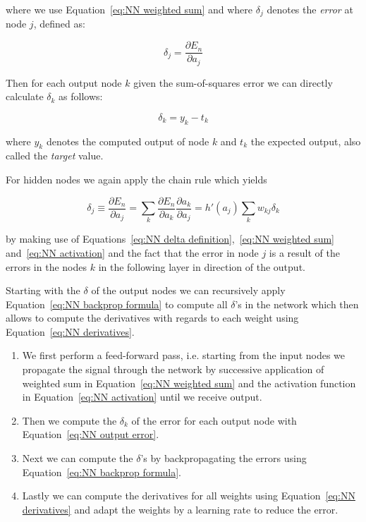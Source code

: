 where we use Equation~\ref{eq:NN weighted sum} and where $\delta_j$ denotes the \emph{error} at node $j$, defined as:

\begin{equation}
	\delta_j = \frac{\partial E_n}{\partial a_j}
	\label{eq:NN delta definition}
\end{equation}

Then for each output node $k$ given the sum-of-squares error we can directly calculate $\delta_k$ as follows:

\begin{equation}
	\delta_k = y_k - t_k
	\label{eq:NN output error}
\end{equation}

where $y_k$ denotes the computed output of node $k$ and $t_k$ the expected output, also called the \emph{target} value.

For hidden nodes we again apply the chain rule which yields

\begin{equation}
	\delta_j \equiv \frac{\partial E_n}{\partial a_j} = \sum_k \frac{\partial E_n}{\partial a_k} \frac{\partial a_k}{\partial a_j}
	= h'(a_j) \sum_k w_{kj}\delta_k
	\label{eq:NN backprop formula}
\end{equation}

by making use of Equations~\ref{eq:NN delta definition},~\ref{eq:NN weighted sum} and~\ref{eq:NN activation} and the fact that the error in node $j$ is a result of the errors in the nodes $k$ in the following layer in direction of the output.

Starting with the $\delta$ of the output nodes we can recursively apply Equation~\ref{eq:NN backprop formula} to compute all $\delta$'s in the network which then allows to compute the derivatives with regards to each weight using Equation~\ref{eq:NN derivatives}.

\begin{enumerate}
  \item We first perform a feed-forward pass, i.e. starting from the input nodes we propagate the signal through the network by successive application of weighted sum in Equation~\ref{eq:NN weighted sum} and  the activation function in Equation~\ref{eq:NN activation} until we receive output.
  \item Then we compute the $\delta_k$ of the error for each output node with Equation~\ref{eq:NN output error}.
	\item Next we can compute the $\delta$'s by backpropagating the errors using Equation~\ref{eq:NN backprop formula}.
	\item Lastly we can compute the derivatives for all weights using Equation~\ref{eq:NN derivatives} and adapt the weights by a learning rate to reduce the error.
\end{enumerate}

